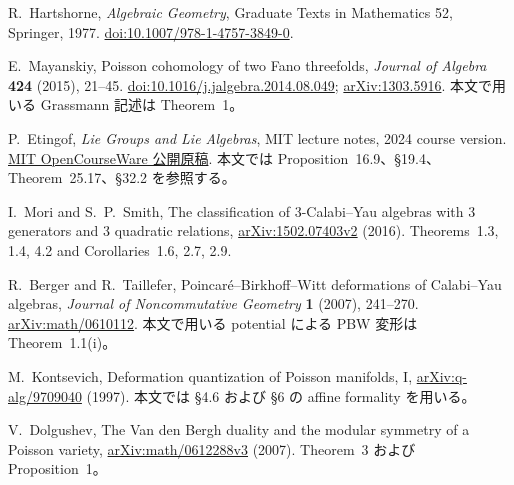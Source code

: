 R.~Hartshorne,
\emph{Algebraic Geometry}, Graduate Texts in Mathematics 52,
Springer, 1977.
\href{https://doi.org/10.1007/978-1-4757-3849-0}{doi:10.1007/978-1-4757-3849-0}.

E.~Mayanskiy,
Poisson cohomology of two Fano threefolds,
\emph{Journal of Algebra} \textbf{424} (2015), 21--45.
\href{https://doi.org/10.1016/j.jalgebra.2014.08.049}{doi:10.1016/j.jalgebra.2014.08.049};
\href{https://arxiv.org/abs/1303.5916}{arXiv:1303.5916}.
本文で用いる Grassmann 記述は Theorem~1。

P.~Etingof,
\emph{Lie Groups and Lie Algebras}, MIT lecture notes, 2024 course version.
\href{https://live.ocw.mit.edu/courses/18-755-lie-groups-and-lie-algebras-ii-spring-2024/mit18_755_s24_lec_full.pdf}{MIT OpenCourseWare 公開原稿}.
本文では Proposition~16.9、\S19.4、Theorem~25.17、\S32.2 を参照する。

I.~Mori and S.~P.~Smith,
The classification of 3-Calabi--Yau algebras with 3 generators and 3 quadratic relations,
\href{https://arxiv.org/abs/1502.07403v2}{arXiv:1502.07403v2} (2016).
Theorems~1.3, 1.4, 4.2 and Corollaries~1.6, 2.7, 2.9.

R.~Berger and R.~Taillefer,
Poincar\'e--Birkhoff--Witt deformations of Calabi--Yau algebras,
\emph{Journal of Noncommutative Geometry} \textbf{1} (2007), 241--270.
\href{https://arxiv.org/abs/math/0610112}{arXiv:math/0610112}.
本文で用いる potential による PBW 変形は Theorem~1.1(i)。

M.~Kontsevich,
Deformation quantization of Poisson manifolds, I,
\href{https://arxiv.org/abs/q-alg/9709040}{arXiv:q-alg/9709040} (1997).
本文では \S4.6 および \S6 の affine formality を用いる。

V.~Dolgushev,
The Van den Bergh duality and the modular symmetry of a Poisson variety,
\href{https://arxiv.org/abs/math/0612288v3}{arXiv:math/0612288v3} (2007).
Theorem~3 および Proposition~1。
